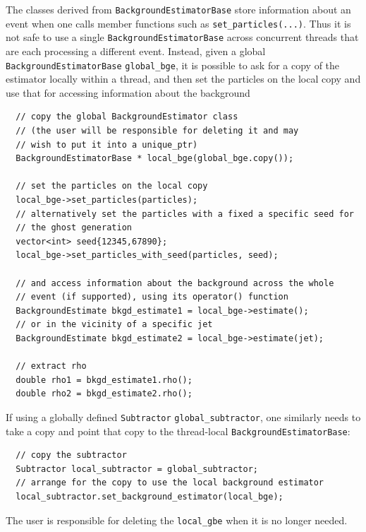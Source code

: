 \documentclass[12pt,a4]{article}
\newcommand{\ttt}[1]{{\small\texttt{#1}}}
\begin{document}
The classes derived from \ttt{BackgroundEstimatorBase} store
information about an event when one calls member functions such as
\ttt{set\_particles(...)}.
%
Thus it is not safe to use a single \ttt{BackgroundEstimatorBase}
across concurrent threads that are each processing a different event.
%
Instead, given a global \ttt{BackgroundEstimatorBase}
\ttt{global\_bge}, it is possible to ask for a copy of the estimator
locally within a thread, and then set the particles on the local copy
and use that for accessing information about the background
\begin{lstlisting}
  // copy the global BackgroundEstimator class
  // (the user will be responsible for deleting it and may
  // wish to put it into a unique_ptr)
  BackgroundEstimatorBase * local_bge(global_bge.copy());

  // set the particles on the local copy
  local_bge->set_particles(particles);
  // alternatively set the particles with a fixed a specific seed for
  // the ghost generation
  vector<int> seed{12345,67890};
  local_bge->set_particles_with_seed(particles, seed);
  
  // and access information about the background across the whole
  // event (if supported), using its operator() function
  BackgroundEstimate bkgd_estimate1 = local_bge->estimate();
  // or in the vicinity of a specific jet
  BackgroundEstimate bkgd_estimate2 = local_bge->estimate(jet);

  // extract rho
  double rho1 = bkgd_estimate1.rho();
  double rho2 = bkgd_estimate2.rho();
\end{lstlisting}
If using a globally defined \ttt{Subtractor} \ttt{global\_subtractor},
one similarly needs to take a copy and point that copy to the
thread-local \ttt{BackgroundEstimatorBase}:
\begin{lstlisting}
  // copy the subtractor
  Subtractor local_subtractor = global_subtractor;
  // arrange for the copy to use the local background estimator
  local_subtractor.set_background_estimator(local_bge);
\end{lstlisting}
%
The user is responsible for deleting the \ttt{local\_gbe} when it is
no longer needed.
\end{document}
